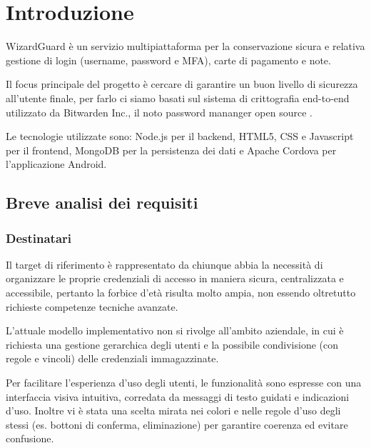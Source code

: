 \documentclass[a4paper]{report}
\begin{document}
\restoregeometry

\tableofcontents



\chapter{Introduzione}\label{chapt:sum}
WizardGuard è un servizio multipiattaforma per la conservazione sicura e relativa gestione di login (username, password e MFA), carte di pagamento e note.

Il focus principale del progetto è cercare di garantire un buon livello di sicurezza all'utente finale, per farlo ci siamo basati sul sistema di crittografia end-to-end utilizzato da Bitwarden Inc., il noto password mananger open source \cite{bitwarden}.

Le tecnologie utilizzate sono: Node.js per il backend, HTML5, CSS e Javascript per il frontend, MongoDB per la persistenza dei dati e Apache Cordova per l'applicazione Android.

\section{Breve analisi dei requisiti}
\subsection{Destinatari}
Il target di riferimento è rappresentato da chiunque abbia la necessità di organizzare le proprie credenziali di accesso in maniera sicura, centralizzata e accessibile, pertanto la forbice d'età risulta molto ampia, non essendo oltretutto richieste competenze tecniche avanzate.

L'attuale modello implementativo non si rivolge all'ambito aziendale, in cui è richiesta una gestione gerarchica degli utenti e la possibile condivisione (con regole e vincoli) delle credenziali immagazzinate.

Per facilitare l'esperienza d'uso degli utenti, le funzionalità sono espresse con una interfaccia visiva intuitiva, corredata da messaggi di testo guidati e indicazioni d'uso. Inoltre vi è stata una scelta mirata nei colori e nelle regole d'uso degli stessi (es. bottoni di conferma, eliminazione) per garantire coerenza ed evitare confusione.
\end{document}
